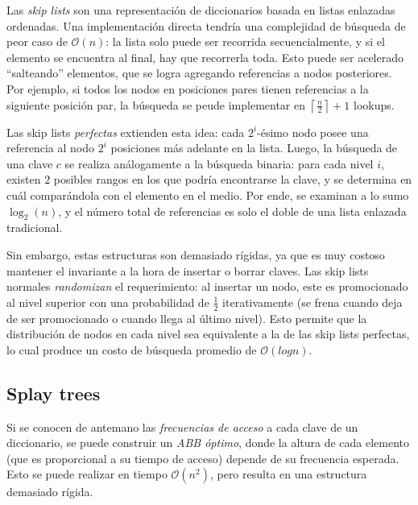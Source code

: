 \documentclass{article}
\newcommand{\BigO}[1]{{\mathcal{O}(#1)}}
\begin{document}
Las \textit{skip lists} son una representación de diccionarios basada en listas enlazadas ordenadas. Una implementación directa tendría una complejidad de búsqueda de peor caso de $\BigO{n}$: la lista solo puede ser recorrida secuencialmente, y si el elemento se encuentra al final, hay que recorrerla toda. Esto puede ser acelerado ``salteando'' elementos, que se logra agregando referencias a nodos posteriores. Por ejemplo, si todos los nodos en posiciones pares tienen referencias a la siguiente posición par, la búsqueda se peude implementar en $\left\lceil \frac{n}{2} \right\rceil + 1$ lookups.

Las skip lists \textit{perfectas} extienden esta idea: cada $2^i$-ésimo nodo posee una referencia al nodo $2^i$ posiciones más adelante en la lista. Luego, la búsqueda de una clave $c$ se realiza análogamente a la búsqueda binaria: para cada nivel $i$, existen $2$ posibles rangos en los que podría encontrarse la clave, y se determina en cuál comparándola con el elemento en el medio. Por ende, se examinan a lo sumo $\log_2(n)$, y el número total de referencias es solo el doble de una lista enlazada tradicional.

Sin embargo, estas estructuras son demasiado rígidas, ya que es muy costoso mantener el invariante a la hora de insertar o borrar claves. Las skip lists normales \textit{randomizan} el requerimiento: al insertar un nodo, este es promocionado al nivel superior con una probabilidad de $\frac{1}{2}$ iterativamente (se frena cuando deja de ser promocionado o cuando llega al último nivel). Esto permite que la distribución de nodos en cada nivel sea equivalente a la de las skip lists perfectas, lo cual produce un costo de búsqueda promedio de $\BigO{log{n}}$.

\subsection{Splay trees}

Si se conocen de antemano las \textit{frecuencias de acceso} a cada clave de un diccionario, se puede construir un \textit{ABB óptimo}, donde la altura de cada elemento (que es proporcional a su tiempo de acceso) depende de su frecuencia esperada. Esto se puede realizar en tiempo $\BigO{n^2}$, pero resulta en una estructura demasiado rígida.
\end{document}
